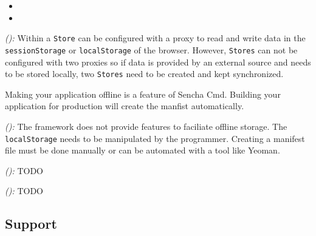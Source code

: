 \documentclass[a4paper]{artikel3}
\newcommand{\code}[1]{\texttt{#1}}
\newcommand{\setspace}[0]{\vspace{2mm}}
\renewcommand{\paragraph}[1]{\setspace \noindent {\bf #1}  }
\newcommand{\framework}[2]{ \emph{#1 (\textbf{#2}): }} %
\newcommand{\challenge}[1]{\paragraph{#1}}
\begin{document}

\challenge{\chal{offline}}

\begin{itemize}
 \item {}
 \item {}
\end{itemize}


\framework{\sta{}}{}
Within \st{} a \code{Store} can be configured with a proxy to read and write data in the \code{sessionStorage} or \code{localStorage} of the browser.
However,  \code{Stores} can not be configured with two proxies so if data is provided by an external source and needs to be stored locally,  two \code{Stores} need to be created and kept synchronized.

Making your application offline is a feature of Sencha Cmd.
Building your application for production will create the manfist automatically.

\framework{\kendoa{}}{}
The framework does not provide features to faciliate offline storage.
The \code{localStorage} needs to be manipulated by the programmer.
Creating a manifest file must be done manually or can be automated with a tool like Yeoman. %

\framework{\jqma{}}{}
TODO

\framework{\lungoa{}}{}
TODO



\subsection{Support} %
\label{sec:evaluation-support}
\end{document}

